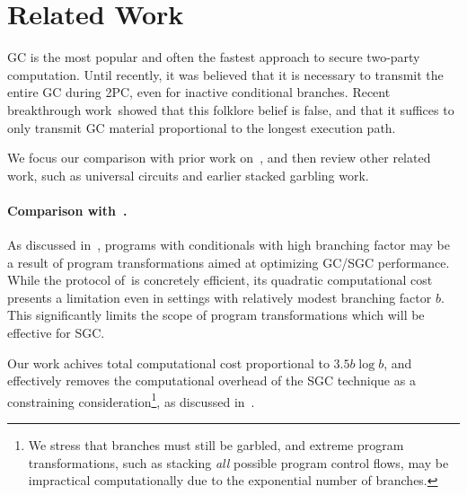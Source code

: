 \section{Related Work}\label{sec:relwork}


GC is the most popular and often the fastest approach to secure two-party computation.  Until recently, it was believed that it is necessary
to transmit the entire GC during 2PC, even for inactive conditional
branches.
Recent breakthrough work~\HK showed that this folklore
belief is false, and that  it suffices to only transmit GC material  proportional to the
longest execution path. %

We focus our comparison with prior work on~\HK, and then review other
related work, such as universal circuits and  earlier stacked garbling work.


\paragraph{Comparison with~\HK.} As discussed
in~, programs with conditionals with high
branching factor may be a result of program transformations aimed at
optimizing GC/SGC performance.  While the protocol of~\HK is
concretely efficient, its quadratic computational cost presents a
limitation even in settings with  relatively  modest branching factor
$b$.  This significantly limits the scope of program transformations
which will be effective for SGC.


Our work achives total computational cost proportional to $3.5 b \log
b$, and  effectively removes the computational overhead of the SGC
technique as a constraining consideration\footnote{We stress that
branches must still be garbled, and extreme program transformations,
such as stacking {\em all} possible program control flows, may be
impractical computationally due to the exponential number of
branches.}, as discussed in~. 


